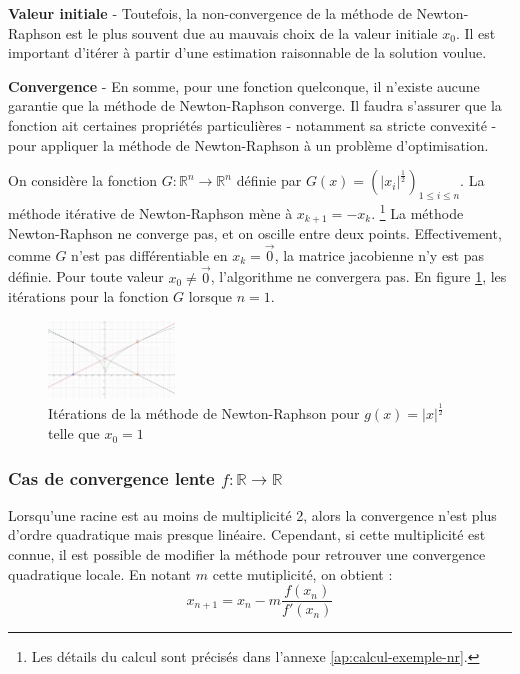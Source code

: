 \documentclass[3p, twocolumn]{elsarticle}
\begin{document}
\textbf{Valeur initiale} - Toutefois, la non-convergence de la méthode de Newton-Raphson est le plus souvent due au mauvais choix de la valeur initiale $x_{0}$. Il est important d'itérer à partir d'une estimation raisonnable de la solution voulue.

\textbf{Convergence} - En somme, pour une fonction quelconque, il n'existe aucune garantie que la méthode de Newton-Raphson converge. Il faudra s'assurer que la fonction ait certaines propriétés particulières - notamment sa stricte convexité - pour appliquer la méthode de Newton-Raphson à un problème d'optimisation. 

\begin{exemple}
    On considère la fonction $G:\mathbb R^n\rightarrow \mathbb R^n$ définie par $G(x)=\left(\lvert x_i\rvert^{\frac12}\right)_{1\leq i\leq n}$. La méthode itérative de Newton-Raphson mène à $x_{k+1}=-x_k$. \footnote{Les détails du calcul sont précisés dans l'annexe \ref{ap:calcul-exemple-nr}.}
    \label{ex:newton-raphson-non-differentiable}
    La méthode Newton-Raphson ne converge pas, et on oscille entre deux points. Effectivement, comme $G$ n'est pas différentiable en $x_k=\overrightarrow 0$, la matrice jacobienne n'y est pas définie. Pour toute valeur $x_0\neq \overrightarrow 0$, l'algorithme ne convergera pas. En figure \ref{fig:nr-iterations-2}, les itérations pour la fonction $G$ lorsque $n=1$.
    \begin{figure}[htbp]
        \centering
        \includegraphics[width = 0.3\textwidth]{iteration-newton-2.png}
        \caption{Itérations de la méthode de Newton-Raphson pour $g(x) = \lvert x \rvert ^{\frac12}$ telle que $x_0 = 1$}
        \label{fig:nr-iterations-2}
    \end{figure}
\end{exemple}

\subsubsection{Cas de convergence lente $f:\mathbb{R}\rightarrow \mathbb{R}$}
Lorsqu'une racine est au moins de multiplicité 2, alors la convergence n'est plus d'ordre quadratique mais presque linéaire. Cependant, si cette multiplicité est connue, il est possible de modifier la méthode pour retrouver une convergence quadratique locale. En notant $m$ cette mutiplicité, on obtient :
\begin{equation*}
    x_{n+1}=x_{n}-m\frac{f(x_{n})}{f'(x_{n})}    
\end{equation*}
\end{document}
